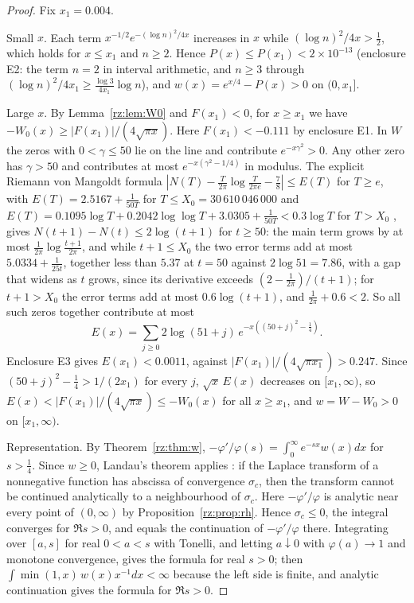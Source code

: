 \begin{proof}
Fix $x_1=0.004$.

Small $x$. Each term $x^{-1/2}e^{-(\log n)^2/4x}$ increases in $x$ while $(\log n)^2/4x>\frac12$, which holds for $x\le x_1$ and $n\ge2$. Hence $P(x)\le P(x_1)<2\times10^{-13}$ (enclosure E2: the term $n=2$ in interval arithmetic, and $n\ge3$ through $(\log n)^2/4x_1\ge\frac{\log3}{4x_1}\log n$), and $w(x)=e^{x/4}-P(x)>0$ on $(0,x_1]$.

Large $x$. By Lemma~\ref{rz:lem:W0} and $F(x_1)<0$, for $x\ge x_1$ we have $-W_0(x)\ge|F(x_1)|/(4\sqrt{\pi x})$. Here $F(x_1)<-0.111$ by enclosure E1. In $W$ the zeros with $0<\gamma\le50$ lie on the line \cite{Backlund} and contribute $e^{-x\gamma^2}>0$. Any other zero has $\gamma>50$ and contributes at most $e^{-x(\gamma^2-1/4)}$ in modulus. The explicit Riemann von Mangoldt formula $|N(T)-\frac T{2\pi}\log\frac T{2\pi e}-\frac78|\le E(T)$ for $T\ge e$, with $E(T)=2.5167+\frac1{50T}$ for $T\le X_0=30\,610\,046\,000$ and $E(T)=0.1095\log T+0.2042\log\log T+3.0305+\frac1{50T}<0.3\log T$ for $T>X_0$ \cite[(1.7), (2.7) and Corollary~1.4]{HSW22}, gives $N(t+1)-N(t)\le2\log(t+1)$ for $t\ge50$: the main term grows by at most $\frac1{2\pi}\log\frac{t+1}{2\pi}$, and while $t+1\le X_0$ the two error terms add at most $5.0334+\frac1{25t}$, together less than $5.37$ at $t=50$ against $2\log51=7.86$, with a gap that widens as $t$ grows, since its derivative exceeds $(2-\frac1{2\pi})/(t+1)$; for $t+1>X_0$ the error terms add at most $0.6\log(t+1)$, and $\frac1{2\pi}+0.6<2$. So all such zeros together contribute at most
\[
E(x)=\sum_{j\ge0}2\log(51+j)\,e^{-x((50+j)^2-\frac14)} .
\]
Enclosure E3 gives $E(x_1)<0.0011$, against $|F(x_1)|/(4\sqrt{\pi x_1})>0.247$. Since $(50+j)^2-\frac14>1/(2x_1)$ for every $j$, $\sqrt x\,E(x)$ decreases on $[x_1,\infty)$, so $E(x)<|F(x_1)|/(4\sqrt{\pi x})\le-W_0(x)$ for all $x\ge x_1$, and $w=W-W_0>0$ on $[x_1,\infty)$.

Representation. By Theorem~\ref{rz:thm:w}, $-\varphi'/\varphi(s)=\int_0^\infty e^{-sx}w(x)dx$ for $s>\frac14$. Since $w\ge0$, Landau's theorem applies \cite[Chapter~II, Theorem~5b]{Widder41}: if the Laplace transform of a nonnegative function has abscissa of convergence $\sigma_c$, then the transform cannot be continued analytically to a neighbourhood of $\sigma_c$. Here $-\varphi'/\varphi$ is analytic near every point of $(0,\infty)$ by Proposition~\ref{rz:prop:rh}. Hence $\sigma_c\le0$, the integral converges for $\Re s>0$, and equals the continuation of $-\varphi'/\varphi$ there. Integrating over $[a,s]$ for real $0<a<s$ with Tonelli, and letting $a\downarrow0$ with $\varphi(a)\to1$ and monotone convergence, gives the formula for real $s>0$; then $\int\min(1,x)\,w(x)x^{-1}dx<\infty$ because the left side is finite, and analytic continuation gives the formula for $\Re s>0$.
\end{proof}

